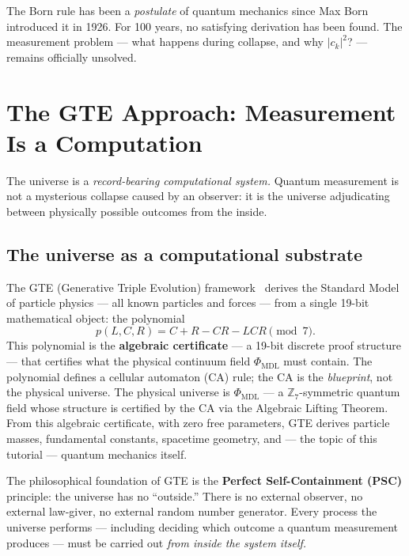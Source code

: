 \documentclass[11pt,a4paper]{article}
\newcommand{\term}[1]{\textbf{#1}}
\newcommand{\PHIMDL}{\Phi_{\mathrm{MDL}}}
\begin{document}
\begin{tcolorbox}[colback=boxred,colframe=red!50!black,title=The situation in 1926--2026]
The Born rule has been a \emph{postulate} of quantum mechanics since Max Born
introduced it in 1926.  For 100 years, no satisfying derivation has been found.
The measurement problem --- what happens during collapse, and why $|c_k|^2$? ---
remains officially unsolved.
\end{tcolorbox}

\section{The GTE Approach: Measurement Is a Computation}

\begin{tcolorbox}[colback=boxgreen,colframe=green!50!black,title=The GTE key insight]
The universe is a \emph{record-bearing computational system.}  Quantum measurement
is not a mysterious collapse caused by an observer: it is the universe adjudicating
between physically possible outcomes from the inside.
\end{tcolorbox}

\subsection{The universe as a computational substrate}

The GTE (Generative Triple Evolution) framework~\cite{SpivackGTECompleteFramework} derives the Standard Model
of particle physics --- all known particles and forces --- from a single 19-bit
mathematical object: the polynomial
\[
  p(L, C, R) = C + R - CR - LCR \pmod{7}.
\]
This polynomial is the \term{algebraic certificate} — a 19-bit discrete proof
structure — that certifies what the physical continuum field $\PHIMDL$ must contain.
The polynomial defines a cellular automaton (CA) rule; the CA is the
\emph{blueprint}, not the physical universe.
The physical universe is $\PHIMDL$ — a $\mathbb{Z}_7$-symmetric quantum field whose
structure is certified by the CA via the Algebraic Lifting Theorem.
From this algebraic certificate, with zero free parameters, GTE derives
particle masses, fundamental constants, spacetime geometry, and --- the topic of
this tutorial --- quantum mechanics itself.

The philosophical foundation of GTE is the \term{Perfect Self-Containment (PSC)}
principle: the universe has no ``outside.''  There is no external observer, no
external law-giver, no external random number generator.  Every process the
universe performs --- including deciding which outcome a quantum measurement produces
--- must be carried out \emph{from inside the system itself.}
\end{document}
